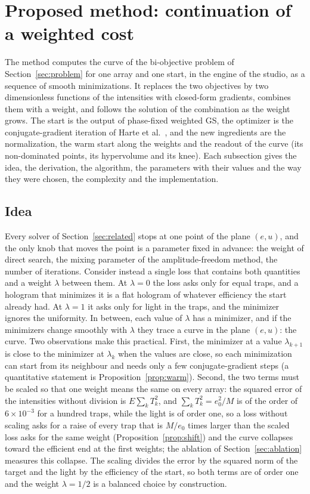 \section{Proposed method: continuation of a weighted cost}\label{sec:method}

The method computes the curve of the bi-objective problem of Section~\ref{sec:problem} for one array and one start, in the engine of the studio, as a sequence of smooth minimizations. It replaces the two objectives by two dimensionless functions of the intensities with closed-form gradients,
combines them with a weight, and follows the solution of the combination as the weight grows. The start is the output of phase-fixed weighted GS, the optimizer is the conjugate-gradient iteration of Harte et al.~\cite{harte}, and the new ingredients are the normalization, the warm start along the weights and the readout of the curve
(its non-dominated points, its hypervolume and its knee). Each subsection gives the idea, the derivation, the algorithm, the parameters with their values and the way they were chosen, the complexity and the implementation.

\subsection{Idea}\label{sec:idea}

Every solver of Section~\ref{sec:related} stops at one point of the plane $(e,u)$, and the only knob that moves the point is a parameter fixed in advance: the weight of direct search, the mixing parameter of the amplitude-freedom method, the number of iterations. Consider instead a single loss
that contains both quantities and a weight $\lambda$ between them. At $\lambda=0$ the loss asks only for equal traps, and a hologram that minimizes it is a flat hologram of whatever efficiency the start already had. At $\lambda=1$ it asks only for light in the traps, and the minimizer ignores the uniformity.
In between, each value of $\lambda$ has a minimizer, and if the minimizers change smoothly with $\lambda$ they trace a curve in the plane $(e,u)$: the curve. Two observations make this practical. First, the minimizer at a value $\lambda_{k+1}$ is close to the minimizer at $\lambda_k$ when the values are close, so each
minimization can start from its neighbour and needs only a few conjugate-gradient steps (a quantitative statement is Proposition~\ref{prop:warm}). Second, the two terms must be scaled so that one weight means the same on every array: the squared error of the intensities without division is $E\sum_kT_k^2$, and $\sum_kT_k^2=e_0^2/M$ is of the order of $6\times10^{-3}$ for a hundred traps, while the light is of order one,
so a loss without scaling asks for a raise of every trap that is $M/e_0$ times larger than the scaled loss asks for the same weight (Proposition~\ref{prop:shift}) and the curve collapses toward the efficient end at the first weights; the ablation of Section~\ref{sec:ablation} measures this collapse. The scaling divides the error by the squared norm of the target and the light by the efficiency of the start, so both terms are of order one and
the weight $\lambda=1/2$ is a balanced choice by construction.


